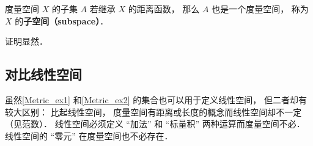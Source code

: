 \begin{corollary}{}
度量空间 $X$ 的子集 $A$ 若继承 $X$ 的距离函数， 那么 $A$ 也是一个度量空间， 称为 $X$ 的\textbf{子空间（subspace）}．
\end{corollary}
证明显然．

\subsection{对比线性空间}
虽然\autoref{Metric_ex1} 和\autoref{Metric_ex2} 的集合也可以用于定义线性空间， 但二者却有较大区别： 比起线性空间， 度量空间有距离或长度的概念而线性空间却不一定（见范数）． 线性空间必须定义 “加法” 和 “标量积” 两种运算而度量空间不必． 线性空间的 “零元” 在度量空间也不必存在．
